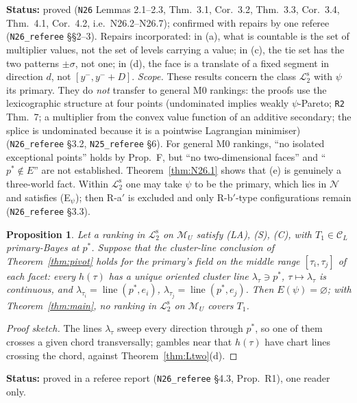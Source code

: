 \documentclass[11pt]{article}
\newtheorem{proposition}[theorem]{Proposition}
\theoremstyle{definition}
\theoremstyle{remark}
\newcommand{\M}{\mathcal M}
\newcommand{\C}{\mathcal C}
\newcommand{\lin}{\operatorname{line}}
\newcommand{\src}[1]{\texttt{#1}}
\newcommand{\status}[1]{\par\smallskip\noindent\textbf{Status:} #1\par\smallskip}
\newcommand{\Ltwo}{\mathcal L_2^{\mathrm s}}
\begin{document}
\status{proved (\src{N26} Lemmas 2.1--2.3, Thm.~3.1, Cor.~3.2, Thm.~3.3, Cor.~3.4, Thm.~4.1, Cor.~4.2, i.e.\ N26.2--N26.7); confirmed with repairs by one referee (\src{N26\_referee} \S\S2--3). Repairs incorporated: in (a), what is countable is the set of multiplier values, not the set of levels carrying a value; in (c), the tie set has the two patterns $\pm\sigma$, not one; in (d), the face is a translate of a fixed segment in direction $d$, not $[y^-,y^-+D]$. \emph{Scope.} These results concern the class $\Ltwo$ with $\psi$ its primary. They do \emph{not} transfer to general M0 rankings: the proofs use the lexicographic structure at four points (undominated implies weakly $\psi$-Pareto; \src{R2} Thm.~7; a multiplier from the convex value function of an additive secondary; the splice is undominated because it is a pointwise Lagrangian minimiser) (\src{N26\_referee} \S3.2, \src{N25\_referee} \S6). For general M0 rankings, ``no isolated exceptional points'' holds by Prop.~F, but ``no two-dimensional faces'' and ``$p^*\notin E$'' are not established. Theorem~\ref{thm:N26.1} shows that (e) is genuinely a three-world fact. Within $\Ltwo$ one may take $\psi$ to be the primary, which lies in $\mathcal N$ and satisfies (E$_\psi$); then R-a$'$ is excluded and only R-b$'$-type configurations remain (\src{N26\_referee} \S3.3).}

\begin{proposition}\label{prop:R1N26}
Let a ranking in $\Ltwo$ on $\M_U$ satisfy (LA), (S), (C), with $T_1\in\C_L$ primary-Bayes at $p^*$. Suppose that the cluster-line conclusion of Theorem~\ref{thm:pivot} holds for the primary's field on the middle range $[\tau_i,\tau_j]$ of each facet: every $h(\tau)$ has a unique oriented cluster line $\lambda_\tau\ni p^*$, $\tau\mapsto\lambda_\tau$ is continuous, and $\lambda_{\tau_i}=\lin(p^*,e_i)$, $\lambda_{\tau_j}=\lin(p^*,e_j)$. Then $E(\psi)=\varnothing$; with Theorem~\ref{thm:main}, no ranking in $\Ltwo$ on $\M_U$ covers $T_1$.
\end{proposition}
\begin{proof}[Proof sketch]
The lines $\lambda_\tau$ sweep every direction through $p^*$, so one of them crosses a given chord transversally; gambles near that $h(\tau)$ have chart lines crossing the chord, against Theorem~\ref{thm:Ltwo}(d).
\end{proof}
\status{proved in a referee report (\src{N26\_referee} \S4.3, Prop.~R1), one reader only.}
\end{document}

